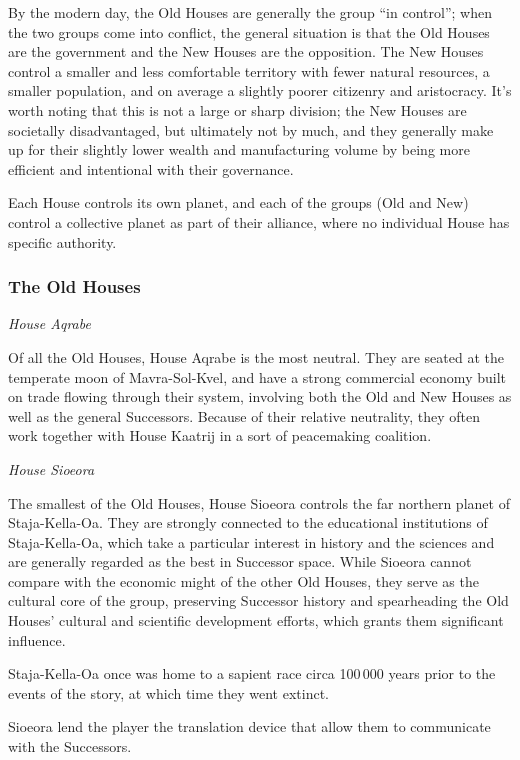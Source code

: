 \documentclass[11pt]{report}
\begin{document}
    By the modern day, the Old Houses are generally the group ``in control''; when the two groups come into conflict, the general situation is that the Old Houses are the government and the New Houses are the opposition. The New Houses control a smaller and less comfortable territory with fewer natural resources, a smaller population, and on average a slightly poorer citizenry and aristocracy. It's worth noting that this is not a large or sharp division; the New Houses are societally disadvantaged, but ultimately not by much, and they generally make up for their slightly lower wealth and manufacturing volume by being more efficient and intentional with their governance.

    Each House controls its own planet, and each of the groups (Old and New) control a collective planet as part of their alliance, where no individual House has specific authority.


    \subsubsection{The Old Houses}

    \noindent
    \emph{House Aqrabe}

    Of all the Old Houses, House Aqrabe is the most neutral. They are seated at the temperate moon of Mavra-Sol-Kvel, and have a strong commercial economy built on trade flowing through their system, involving both the Old and New Houses as well as the general Successors. Because of their relative neutrality, they often work together with House Kaatrij in a sort of peacemaking coalition.
    \bigskip

    \noindent
    \emph{House Sioeora}

    The smallest of the Old Houses, House Sioeora controls the far northern planet of Staja-Kella-Oa. They are strongly connected to the educational institutions of Staja-Kella-Oa, which take a particular interest in history and the sciences and are generally regarded as the best in Successor space. While Sioeora cannot compare with the economic might of the other Old Houses, they serve as the cultural core of the group, preserving Successor history and spearheading the Old Houses' cultural and scientific development efforts, which grants them significant influence.

    Staja-Kella-Oa once was home to a sapient race circa 100\,000 years prior to the events of the story, at which time they went extinct.

    Sioeora lend the player the translation device that allow them to communicate with the Successors.
    \bigskip
\end{document}
